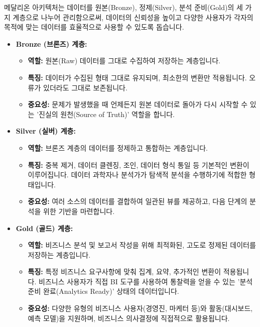 \documentclass[11pt,a4paper]{article}
\theoremstyle{definition}
\begin{document}
\begin{summarybox}[title=핵심 요약: 데이터 품질 관리]
메달리온 아키텍처는 데이터를 원본(Bronze), 정제(Silver), 분석 준비(Gold)의 세 가지 계층으로 나누어 관리함으로써, 데이터의 신뢰성을 높이고 다양한 사용자가 각자의 목적에 맞는 데이터를 효율적으로 사용할 수 있도록 돕습니다.
\end{summarybox}

\begin{itemize}
    \item \textbf{Bronze (브론즈) 계층:}
    \begin{itemize}
        \item \textbf{역할:} 원본(Raw) 데이터를 그대로 수집하여 저장하는 계층입니다.
        \item \textbf{특징:} 데이터가 수집된 형태 그대로 유지되며, 최소한의 변환만 적용됩니다. 오류가 있더라도 그대로 보존됩니다.
        \item \textbf{중요성:} 문제가 발생했을 때 언제든지 원본 데이터로 돌아가 다시 시작할 수 있는 '진실의 원천(Source of Truth)' 역할을 합니다.
    \end{itemize}
    \item \textbf{Silver (실버) 계층:}
    \begin{itemize}
        \item \textbf{역할:} 브론즈 계층의 데이터를 정제하고 통합하는 계층입니다.
        \item \textbf{특징:} 중복 제거, 데이터 클렌징, 조인, 데이터 형식 통일 등 기본적인 변환이 이루어집니다. 데이터 과학자나 분석가가 탐색적 분석을 수행하기에 적합한 형태입니다.
        \item \textbf{중요성:} 여러 소스의 데이터를 결합하여 일관된 뷰를 제공하고, 다음 단계의 분석을 위한 기반을 마련합니다.
    \end{itemize}
    \item \textbf{Gold (골드) 계층:}
    \begin{itemize}
        \item \textbf{역할:} 비즈니스 분석 및 보고서 작성을 위해 최적화된, 고도로 정제된 데이터를 저장하는 계층입니다.
        \item \textbf{특징:} 특정 비즈니스 요구사항에 맞춰 집계, 요약, 추가적인 변환이 적용됩니다. 비즈니스 사용자가 직접 BI 도구를 사용하여 통찰력을 얻을 수 있는 '분석 준비 완료(Analytics Ready)' 상태의 데이터입니다.
        \item \textbf{중요성:} 다양한 유형의 비즈니스 사용자(경영진, 마케터 등)와 활동(대시보드, 예측 모델)을 지원하며, 비즈니스 의사결정에 직접적으로 활용됩니다.
    \end{itemize}
\end{itemize}
\end{document}
